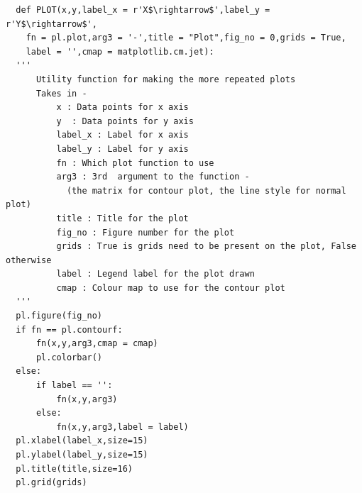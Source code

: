 \documentclass[11pt, a4paper]{article}
\begin{document}
\begin{verbatim}
  def PLOT(x,y,label_x = r'X$\rightarrow$',label_y = r'Y$\rightarrow$',
    fn = pl.plot,arg3 = '-',title = "Plot",fig_no = 0,grids = True,
    label = '',cmap = matplotlib.cm.jet):
  '''
      Utility function for making the more repeated plots
      Takes in -
          x : Data points for x axis
          y  : Data points for y axis
          label_x : Label for x axis
          label_y : Label for y axis
          fn : Which plot function to use
          arg3 : 3rd  argument to the function - 
            (the matrix for contour plot, the line style for normal plot)
          title : Title for the plot
          fig_no : Figure number for the plot
          grids : True is grids need to be present on the plot, False otherwise
          label : Legend label for the plot drawn
          cmap : Colour map to use for the contour plot
  '''
  pl.figure(fig_no)
  if fn == pl.contourf:
      fn(x,y,arg3,cmap = cmap)
      pl.colorbar()
  else:
      if label == '':
          fn(x,y,arg3)
      else:
          fn(x,y,arg3,label = label)
  pl.xlabel(label_x,size=15)
  pl.ylabel(label_y,size=15)
  pl.title(title,size=16)
  pl.grid(grids)
\end{verbatim}
\end{document}

